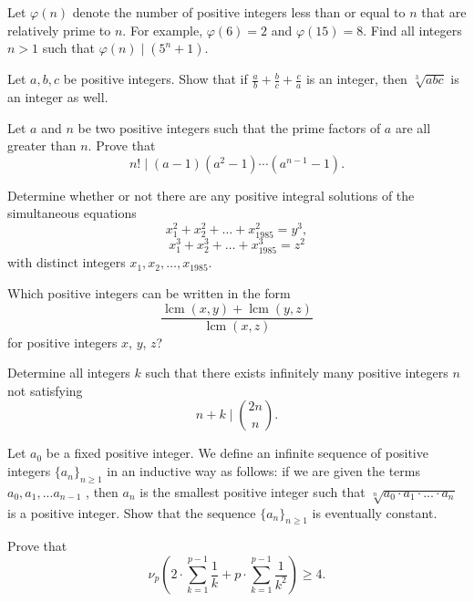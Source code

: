 \documentclass{article}
\begin{document}
\begin{req}[CMC 12B 2021/23]{6}
Let $\varphi(n)$ denote the number of positive integers less than or equal to $n$ that are relatively prime to $n.$ For example, $\varphi(6)=2$ and $\varphi(15)=8.$ Find all integers $n>1$ such that $\varphi(n) \mid (5^n+1)$.
\end{req}

\begin{req}[BAMO 2018/4]{6}
Let $a, b, c$ be positive integers. Show that if $\frac ab+\frac bc+\frac ca$ is an integer, then $\sqrt[3]{abc}$ is an integer as well.
\end{req}

\begin{prob}{6}
Let $a$ and $n$ be two positive integers such that the prime factors of $a$ are all greater than $n$. Prove that \[n!\mid (a-1)(a^2-1)\cdots (a^{n-1}-1).\]
\end{prob}

\begin{prob}[USAMO 1985/1]{6}
Determine whether or not there are any positive integral solutions of the simultaneous equations \[x_1^2+x_2^2+\dots+x_{1985}^2=y^3,\] \[x_1^3+x_2^3+\dots+x_{1985}^3=z^2\] with distinct integers $x_1,x_2,\dots,x_{1985}$.
\end{prob}

\begin{req}[USEMO 2020/1]{9}
Which positive integers can be written in the form \[\frac{\operatorname{lcm}(x, y) + \operatorname{lcm}(y, z)}{\operatorname{lcm}(x, z)}\]for positive integers $x$, $y$, $z$?
\end{req}

\begin{req}[China 2015/4]{9}
Determine all integers $k$ such that there exists infinitely many positive integers $n$ not satisfying \[n+k \mid\binom{2n}{n}.\]
\end{req}

\begin{prob}[Kosovo 2020/12.4]{9}
Let $a_0$ be a fixed positive integer. We define an infinite sequence of positive integers $\{a_n\}_{n\ge 1}$ in an inductive way as follows: if we are given the terms $a_0,a_1,...a_{n-1}$ , then $a_n$ is the smallest positive integer such that $\sqrt[n]{a_0\cdot a_1\cdot ...\cdot a_n}$ is a positive integer. Show that the sequence $\{a_n\}_{n\ge 1}$ is eventually constant.
\end{prob}

\begin{prob}[Dospinescu]{9}
Prove that \[\nu_p\left(2\cdot\sum_{k=1}^{p-1}\frac1k+p\cdot\sum_{k=1}^{p-1}\frac1{k^2}\right)\geq4.\]
\end{prob}
\end{document}
